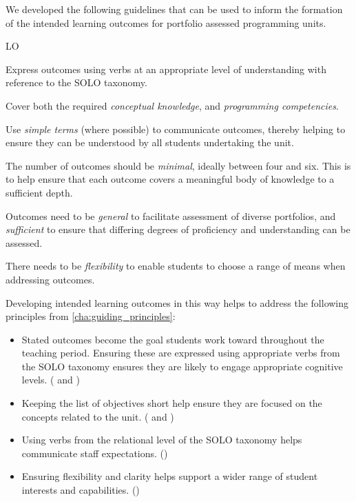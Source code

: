 We developed the following guidelines that can be used to inform the formation of the intended learning outcomes for portfolio assessed programming units. %
\begin{guidelines}{LO}
  \item \label{lo-solo} Express outcomes using verbs at an appropriate level of understanding with reference to the SOLO taxonomy.
  \item \label{lo-know-prog} Cover both the required \emph{conceptual knowledge}, and \emph{programming competencies}.
  \item \label{lo-simple-terms} Use \emph{simple terms} (where possible) to communicate outcomes, thereby helping to ensure they can be understood by all students undertaking the unit.
  \item The number of outcomes should be \emph{minimal}, ideally between four and six. This is to help ensure that each outcome covers a meaningful body of knowledge to a sufficient depth.\label{lo-minimal}
  \item Outcomes need to be \emph{general} to facilitate assessment of diverse portfolios, and \emph{sufficient} to ensure that differing degrees of proficiency and understanding can be assessed.\label{lo-general}
  \item There needs to be \emph{flexibility} to enable students to choose a range of means when addressing outcomes.\label{lo-flex}
\end{guidelines}

Developing intended learning outcomes in this way helps to address the following principles from \cref{cha:guiding_principles}:
\begin{itemize}[noitemsep,nolistsep]
	\item Stated outcomes become the goal students work toward throughout the teaching period. Ensuring these are expressed using appropriate verbs from the SOLO taxonomy ensures they are likely to engage appropriate cognitive levels. ( and )
	\item Keeping the list of objectives short help ensure they are focused on the concepts related to the unit. ( and )
	\item Using verbs from the relational level of the SOLO taxonomy helps communicate staff expectations. ()
	\item Ensuring flexibility and clarity helps support a wider range of student interests and capabilities. ()
\end{itemize}





